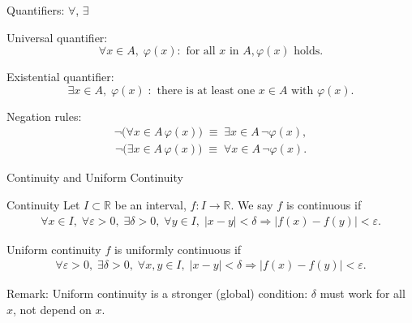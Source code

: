 \begin{frame}{Quantifiers: $\forall$, $\exists$}
  \begin{block}{Universal quantifier:}
  $$\forall x \in A,\; \varphi(x):\!\! \text{ for all } x \text{ in } A, \varphi(x)\text{ holds.}$$
  \end{block}
  \begin{block}{Existential quantifier:}
  $$\exists x \in A,\; \varphi(x) \;:\!\! \text{ there is at least one } x \in A \text{ with } \varphi(x).$$
\end{block}

Negation rules:
\begin{align*}
  \neg \bigl(\forall x \in A\, \varphi(x)\bigr) \;\equiv\; \exists x \in A\, \neg\varphi(x),
\end{align*}
\begin{align*}
  \neg \bigl(\exists x \in A\, \varphi(x)\bigr) \;\equiv\; \forall x \in A\, \neg\varphi(x).
\end{align*}
\end{frame}

\begin{frame}{Continuity and Uniform Continuity}
\begin{block}{Continuity}
Let \(I \subset \mathbb{R}\) be an interval, \(f: I \to \mathbb{R}\). We say \(f\) is continuous if
\begin{align*}
\forall x \in I,\; \forall \varepsilon>0,\; \exists \delta>0,\; \forall y \in I,\;
|x-y|<\delta \Rightarrow |f(x) - f(y)| < \varepsilon.
\end{align*}
\end{block}
\begin{block}{Uniform continuity} \(f\) is uniformly continuous if
\begin{align*}
\forall \varepsilon>0,\; \exists \delta>0,\; \forall x,y \in I,\;
|x-y|<\delta \Rightarrow |f(x) - f(y)| < \varepsilon.
\end{align*}
\end{block}
\vspace{-0.8cm}
\begin{block}{Remark:}
    Uniform continuity is a stronger (global) condition: \(\delta\) must work for all \(x\), not depend on \(x\).
\end{block}
\end{frame}


